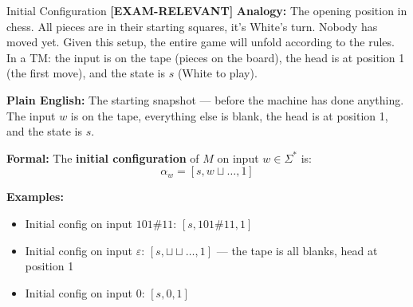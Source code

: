 \documentclass[11pt,a4paper]{article}
\newcommand{\kemark}{\textcolor{red!70!black}{\textbf{[EXAM-RELEVANT]}}}
\begin{document}
\begin{definitionbox}{Initial Configuration \kemark}
\textbf{Analogy:} The opening position in chess. All pieces are in their starting squares, it's White's turn. Nobody has moved yet. Given this setup, the entire game will unfold according to the rules. In a TM: the input is on the tape (pieces on the board), the head is at position 1 (the first move), and the state is $s$ (White to play).

\textbf{Plain English:} The starting snapshot --- before the machine has done anything. The input $w$ is on the tape, everything else is blank, the head is at position 1, and the state is $s$.

\textbf{Formal:} The \textbf{initial configuration} of $M$ on input $w \in \Sigma^*$ is:
$$\alpha_w = [s, w\sqcup\ldots, 1]$$

\textbf{Examples:}
\begin{itemize}[nosep]
\item Initial config on input $101\#11$: $[s, 101\#11, 1]$
\item Initial config on input $\varepsilon$: $[s, \sqcup\sqcup\ldots, 1]$ --- the tape is all blanks, head at position 1
\item Initial config on input $0$: $[s, 0, 1]$
\end{itemize}
\end{definitionbox}
\end{document}
